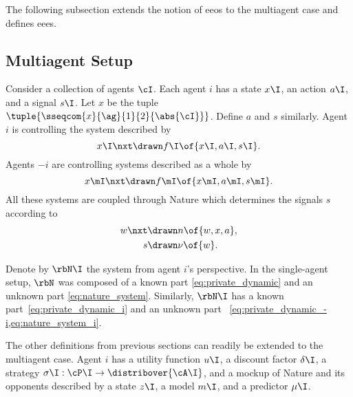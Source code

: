 The following subsection extends the notion of \acp{eeo} to the multiagent case and defines \acp{eee}.

\subsection{Multiagent Setup}

Consider a collection of agents \(\cI\).
Each agent \(i\) has a state \(x\I\), an action \(a\I\), and a signal \(s\I\).
Let \(x\) be the tuple \(\tuple{\sseqcom{x}{\ag}{1}{2}{\abs{\cI}}}\).
Define \(a\) and \(s\) similarly.
Agent \(i\) is controlling the system described by
\begin{equation}
\label{eq:private_dynamic_i}
x\I\nxt \drawn  f\I \of{x\I, a\I, s\I}.
\end{equation}
Agents \(-i\) are controlling systems described as a whole by
\begin{equation}
\label{eq:private_dynamic_-i}
x\mI\nxt \drawn  f\mI \of{x\mI, a\mI, s\mI}.
\end{equation}
All these systems are coupled through Nature which determines the signals \(s\) according to
\begin{subequations}
\label{eq:nature_system_i}
\begin{align}
\label{eq:nature_dynamic_i}
w\nxt &\drawn n \of{w, x, a}, \\
\label{eq:nature_signal_i}
s &\drawn \nu \of{w}.
\end{align}
\end{subequations}

Denote by \(\rbN\I\) the system from agent \(i\)'s perspective.
In the single-agent setup, \(\rbN\) was composed of a known part \cref{eq:private_dynamic} and an unknown part \cref{eq:nature_system}.
Similarly, \(\rbN\I\) has a known part~\cref{eq:private_dynamic_i} and an unknown part~ \cref{eq:private_dynamic_-i,eq:nature_system_i}.

The other definitions from previous sections can readily be extended to the multiagent case.
Agent \(i\) has a utility function \(u\I\), a discount factor \(\delta\I\), a strategy \(\sigma\I : \cP\I \to \distribover{\cA\I}\), and a mockup of Nature and its opponents described by a state \(z\I\), a model \(m\I\), and a predictor \(\mu\I\).

